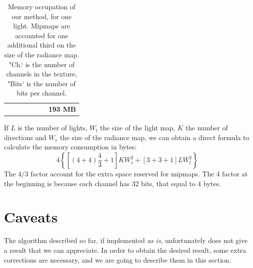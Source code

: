 \begin{table}[!ht]
\begin{tabular}{p{3cm}lllll|l|}
                                             &                                        &                                              &                                     &                                      &                & \textbf{193 MB}       \\ \cline{7-7} 
\end{tabular}
\caption{Memory occupation of our method, for one light. Mipmaps are accounted for one additional third on the size of the radiance map. "Ch.` is the number of channels in the texture, "Bits` is the number of bits per channel.}
\label{table:mlay}
\end{table}

If $L$ is the number of lights, $W_l$ the size of the light map, $K$ the number of directions and $W_s$ the size of the radiance map, we can obtain a direct formula to calculate the memory consumption in bytes:
$$
4 \left\{ \left[\left(4 + 4\right) \frac{4}{3} + 1\right] K W_s^2 + \left[3 + 3 + 1\right] L W_l^2 \right\}
$$
The $4/3$ factor account for the extra space reserved for mipmaps. The 4 factor at the beginning is because each channel has 32 bits, that equal to 4 bytes. 

\FloatBarrier
\section{Caveats}
The algorithm described so far, if implemented \emph{as is}, unfortunately does not give a result that we can appreciate. In order to obtain the desired result, some extra corrections are necessary, and we are going to describe them in this section.

